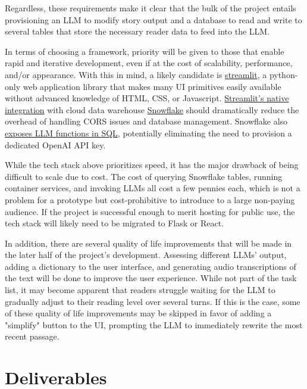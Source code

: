 \documentclass[
	letterpaper, %
]{jdf}
\begin{document}
Regardless, these requirements make it clear that the bulk of the project entails provisioning an LLM to modify story output and a database to read and write to several tables that store the necessary reader data to feed into the LLM.

In terms of choosing a framework, priority will be given to those that enable rapid and iterative development, even if at the cost of scalability, performance, and/or appearance. With this in mind, a likely candidate is \href{https://streamlit.io/}{streamlit}, a python-only web application library that makes many UI primitives easily available without advanced knowledge of HTML, CSS, or Javascript. \href{https://www.snowflake.com/en/data-cloud/overview/streamlit-in-snowflake/}{Streamlit's native integration} with cloud data warehouse \href{https://www.snowflake.com/en/}{Snowflake} should dramatically reduce the overhead of handling CORS issues and database management. Snowflake also \href{https://docs.snowflake.com/en/guides-overview-ai-features}{exposes LLM functions in SQL}, potentially eliminating the need to provision a dedicated OpenAI API key.

While the tech stack above prioritizes speed, it has the major drawback of being difficult to scale due to cost. The cost of querying Snowflake tables, running container services, and invoking LLMs all cost a few pennies each, which is not a problem for a prototype but cost-prohibitive to introduce to a large non-paying audience. If the project is successful enough to merit hosting for public use, the tech stack will likely need to be migrated to Flask or React.
 
In addition, there are several quality of life improvements that will be made in the later half of the project's development. Assessing different LLMs' output, adding a dictionary to the user interface, and generating audio transcriptions of the text will be done to improve the user experience. While not part of the task list, it may become apparent that readers struggle waiting for the LLM to gradually adjust to their reading level over several turns. If this is the case, some of these quality of life improvements may be skipped in favor of adding a "simplify" button to the UI, prompting the LLM to immediately rewrite the most recent passage.

\section{Deliverables}
\end{document}

